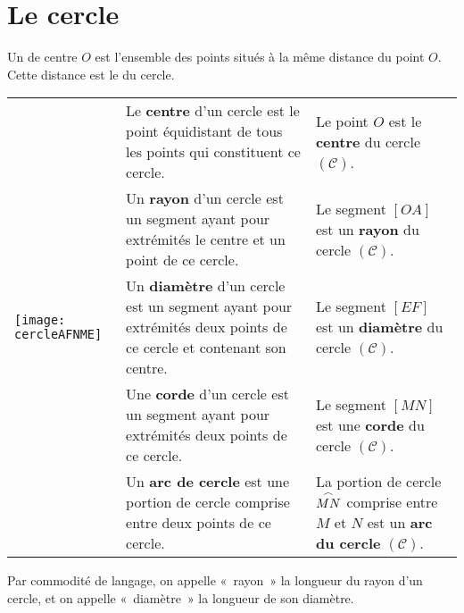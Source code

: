 
\newpage



\section{Le cercle}

\begin{definition}
Un \textbf{} de centre $O$ est l'ensemble des points situés à la même distance du point $O$. 
Cette distance est le \textbf{} du cercle.
\end{definition}

\begin{aconnaitre}
\begin{tabularx}{.95\linewidth}{|X|p{5cm}|p{3cm}|}
\hline
\multirow{5}{*}{\texttt{[image: cercleAFNME]}}  & Le \textcolor{C2}{\textbf{centre}} d'un cercle est le point équidistant de tous les points qui constituent ce cercle. & Le point $O$ est le \textcolor{C2}{\textbf{centre}} du cercle $(\mathcal{C})$.\\ \cline{2-3}
 & Un \textcolor{J1}{\textbf{rayon}} d'un cercle est un segment ayant pour extrémités le centre et un point de ce cercle. & Le segment $[OA]$ est un  \textcolor{J1}{\textbf{rayon}} du cercle $(\mathcal{C})$.\\ \cline{2-3}
  & Un  \textcolor{H1}{\textbf{diamètre}} d'un cercle est un segment ayant pour extrémités deux points de ce cercle et contenant son centre. & Le segment $[EF]$ est un  \textcolor{H1}{\textbf{diamètre}} du cercle $(\mathcal{C})$.\\ \cline{2-3}
 & Une  \textcolor{PartieFonction}{\textbf{corde}} d'un cercle est un segment ayant pour extrémités deux points de ce cercle. & Le segment $[MN]$ est une  \textcolor{PartieFonction}{\textbf{corde}} du cercle $(\mathcal{C})$.\\ \cline{2-3}
 & Un  \textcolor{B2}{\textbf{arc de cercle}} est une portion de cercle comprise entre deux points de ce cercle. & La portion de cercle $\overset{\huge{\frown}}{MN}$ comprise entre $M$ et $N$ est un  \textcolor{B2}{\textbf{arc du cercle}} $(\mathcal{C})$.\\ \hline
  \end{tabularx}
 \end{aconnaitre}
  
  
 \begin{remarque}
 Par commodité de langage, on appelle « rayon » la longueur du rayon d'un cercle, et  on appelle « diamètre » la longueur de son diamètre.
  \end{remarque}
  
